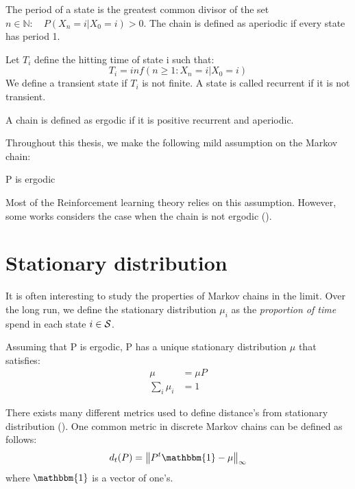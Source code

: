 \begin{definition}
The period of a state is the greatest common divisor of the set {$n \in  \mathbb{N} : \quad P(X_n=i|X_0=i) > 0$}. The chain is defined as aperiodic if every state has period 1.
\end{definition}
\begin{definition}
Let $T_i$ define the hitting time of state i such that:
\begin{equation}
    T_i = inf(n \geq 1 : X_n = i | X_0 = i)
\end{equation}
We define a transient state if $T_i$ is not finite. A state is called recurrent if it is not transient.
\end{definition}


\begin{definition}
A chain is defined as ergodic if it is positive recurrent and aperiodic.
\end{definition}
Throughout this thesis, we make the following mild assumption on the Markov chain:
\begin{assumption}
P is ergodic
\end{assumption}
Most of the Reinforcement learning theory relies on this assumption. However, some works considers the case when the chain is not ergodic (\cite{leike2016nonparametric}).

\section{Stationary distribution}
It is often interesting to study the properties of Markov chains in the limit. Over the long run, we define the stationary distribution $\mu_i$ as the \emph{proportion of time} spend in each state $i \in \mathcal{S}$.
\begin{definition}
Assuming that P is ergodic, P has a unique stationary distribution $\mu$ that satisfies:
\begin{equation}
\begin{split}
    \mu &= \mu P \\
    \sum_i \mu_i &= 1
\end{split}
\end{equation}
\end{definition}
There exists many different metrics used to define distance's from stationary distribution (\cite{levin2017markov}). One common metric in discrete Markov chains can be defined as follows:
\begin{equation}
    d_t(P) = \norm{P^t \mathbbm{1} - \mu}_{ \infty } 
    \label{eq:d_markov}
\end{equation}
where $\mathbbm{1}$ is a vector of one's.
